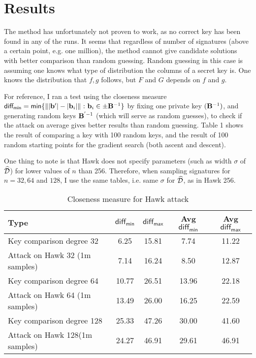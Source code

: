 {{\section{Results}

The method has unfortunately not proven to work, as no correct key has been found in any of the runs. It seems that regardless of number of signatures (above a certain point, e.g. one million), the method cannot give candidate solutions with
better comparison than random guessing. Random guessing in this case is assuming one knows what type of distribution the columns of a secret key is. One knows the distribution that $f, g$ follows, but $F$ and $G$ depends on $f$ and $g$.

For reference, I ran a test using the closeness measure $ \mathsf{diff_{min}} = \mathsf{min} \{\lVert \lvert \vec{b}' \rvert - \lvert \vec{b}_i \rvert \rVert \ \mathbf{:} \ \vec{b}_i \in \pm \mat{B}^{-1}\}$ by fixing one private key $(\mathbf{B}^{-1})$, 
and generating random keys $\mathbf{B}^{'-1}$ (which will serve as random guesses), to check if the attack on average gives better results than random
guessing. Table 1 shows the result of comparing a key with 100 random keys, and the result of 100 random starting points for the gradient search (both ascent and descent).

One thing to note is that Hawk does not specify parameters (such as width $\sigma$ of $\widehat{\mathcal{D}}$) for lower values of $n$ than 256. Therefore, when sampling signatures for $n=32, 64$ and $128$, I use the same tables, i.e. same $\sigma$ for $\widehat{\mathcal{D}}$, as in Hawk 256.

\begin{table}[H]
    \centering
    \caption{Closeness measure for Hawk attack}
    \begin{tabular}{lcccc}
        \toprule
        \textbf{Type} & $\mathsf{diff_{min}}$ & $\mathsf{diff_{max}}$ & \textbf{Avg $\mathsf{diff_{min}}$} & \textbf{Avg $\mathsf{diff_{max}}$} \\
        \midrule
        Key comparison degree 32 & 6.25 & 15.81 & 7.74 & 11.22 \\
        Attack on Hawk 32 (1m samples) & 7.14 & 16.24 & 8.50 & 12.87 \\
        \midrule
        Key comparison degree 64 & 10.77 & 26.51 & 13.96 & 22.18 \\
        Attack on Hawk 64 (1m samples) & 13.49 & 26.00 & 16.25 & 22.59 \\
        \midrule
        Key comparison degree 128 & 25.33 & 47.26 & 30.00 & 41.60 \\
        Attack on Hawk 128(1m samples) & 24.27 & 46.91 & 29.61 & 46.91 \\
        \midrule


\end{tabular}
\end{table}}}
